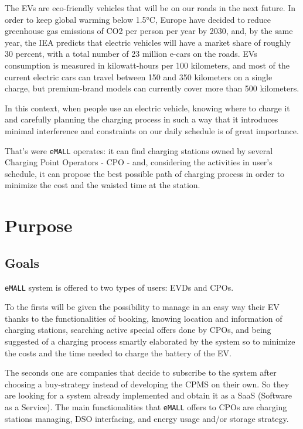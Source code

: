 The EVs are eco-friendly vehicles that will be on our roads in the next future.
In order to keep global warming below 1.5°C, Europe have decided to reduce greenhouse gas emissions of CO2 per
person per year by 2030, and, by the same year, the IEA predicts that electric vehicles will have a market share
of roughly 30 percent, with a total number of 23 million e-cars on the roads.
EVs consumption is measured in kilowatt-hours per 100 kilometers, and most of the current electric cars can travel
between 150 and 350 kilometers on a single charge, but premium-brand models can currently cover more than 500
kilometers.

In this context, when people use an electric vehicle, knowing where to charge it and carefully planning the
charging process in such a way that it introduces minimal interference and constraints on our daily schedule
is of great importance.

That's were \verb|eMALL| operates: it can find charging stations owned by several Charging Point Operators - CPO - and,
considering the activities in user's schedule, it can propose the best possible path of charging process
in order to minimize the cost and the waisted time at the station.
\newpage


\section{Purpose}
\label{sec:purpose}%

\subsection{Goals}
\label{subsec:goals}%
\setcounter{g}{1}
\newcommand{\cg}{\theg\stepcounter{g}}
\verb|eMALL| system is offered to two types of users: EVDs and CPOs.

To the firsts will be given the possibility to manage in an easy way their EV thanks to the functionalities of booking,
knowing location and information of charging stations, searching active special offers done by CPOs, and being suggested
of a charging process smartly elaborated by the system so to minimize the costs and the time needed to charge the battery
of the EV\@.

The seconds one are companies that decide to subscribe to the system after choosing a buy-strategy instead of developing
the CPMS on their own.
So they are looking for a system already implemented and obtain it as a SaaS (Software as a Service).
The main functionalities that \verb|eMALL| offers to CPOs are charging stations managing, DSO interfacing, and energy
usage and/or storage strategy.

